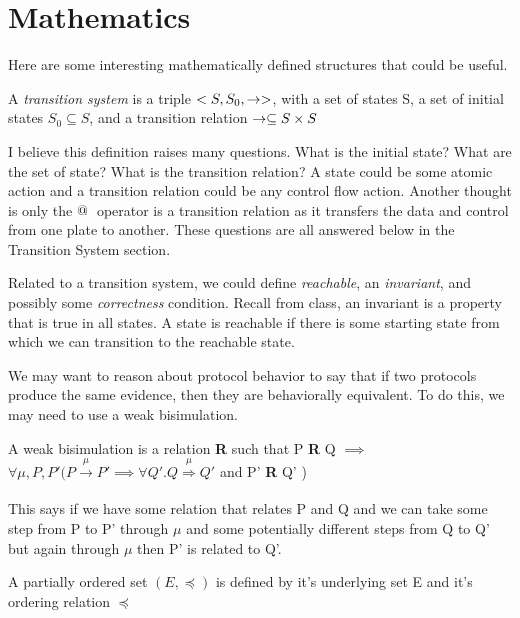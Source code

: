 \documentclass[12pt, letterpaper]{article}
\begin{document}
\section{Mathematics}

Here are some interesting mathematically defined structures that could be useful. 

\begin{defn}
  A \emph{transition system} is a triple $<S,S_0, \to>$, with a set of states S, a set of initial states $S_0 \subseteq S$, and a transition relation $\to \subseteq S \times S$ \cite{FRAP}
\end{defn}

I believe this definition raises many questions. What is the initial state? What are the set of state? What is the transition relation? A state could be some atomic action and a transition relation could be any control flow action. Another thought is only the $\mathop{@_{}}{}$ operator is a transition relation as it transfers the data and control from one plate to another. These questions are all answered below in the Transition System section. 

Related to a transition system, we could define \emph{reachable}, an \emph{invariant}, and possibly some \emph{correctness} condition. Recall from class, an invariant is a property that is true in all states. A state is reachable if there is some starting state from which we can transition to the reachable state. 

We may want to reason about protocol behavior to say that if two protocols produce the same evidence, then they are behaviorally equivalent. To do this, we may need to use a weak bisimulation. 

\begin{defn}
A weak bisimulation is a relation \textbf{R} such that P \textbf{R} Q $\implies$ $\forall \mu, P, P' (P \xrightarrow[]{\mu} P' \implies \forall Q'. Q \overset{\mu}\Rightarrow Q'$ and P' \textbf{R} Q' ) \cite{Milner} 
\end{defn}

This says if we have some relation that relates P and Q and we can take some step from P to P' through $\mu$ and some potentially different steps from Q to Q' but again through $\mu$ then P' is related to Q'.  

\begin{defn}
  A partially ordered set $(E, \preceq)$ is defined by it's underlying set E and it's ordering relation $\preceq$
\end{defn}
\end{document}
